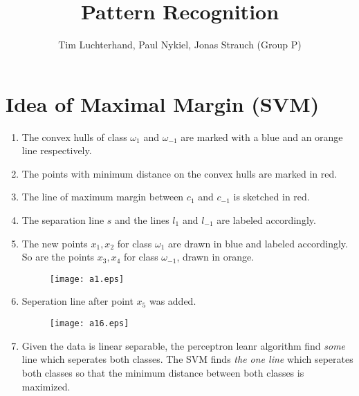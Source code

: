 \documentclass[DIN, pagenumber=false, fontsize=11pt, parskip=half]{scrartcl}
\title{Pattern Recognition}
\author{Tim Luchterhand, Paul Nykiel, Jonas Strauch (Group P)}
\begin{document}
    \maketitle
    \section{Idea of Maximal Margin (SVM)}
    \begin{enumerate}
        \item
        The convex hulls of class $\omega_1$ and $\omega_{-1}$ are marked with a blue and an orange line respectively.
        \item
        The points with minimum distance on the convex hulls are marked in red.
        \item
        The line of maximum margin between $c_1$ and $c_{-1}$ is sketched in red.
        \item
        The separation line $s$ and the lines $l_1$ and $l_{-1}$ are labeled accordingly.
        \item
        The new points $x_1, x_2$ for class $\omega_1$ are drawn in blue and labeled accordingly. So are the points $x_3, x_4$
        for class $\omega_{-1}$, drawn in orange.
        \begin{figure}[h!]
            \centering
            \texttt{[image: a1.eps]}
        \end{figure}
        \newpage
        \item
        Seperation line after point $x_5$ was added. 
        \begin{figure}[h!]
            \centering
            \texttt{[image: a16.eps]}
        \end{figure}
        \item
        Given the data is linear separable, the perceptron leanr algorithm find \textit{some} line which seperates both classes. The
        SVM finds \textit{the one line} which seperates both classes so that the minimum distance between both classes is maximized.
    \end{enumerate}
\end{document}
